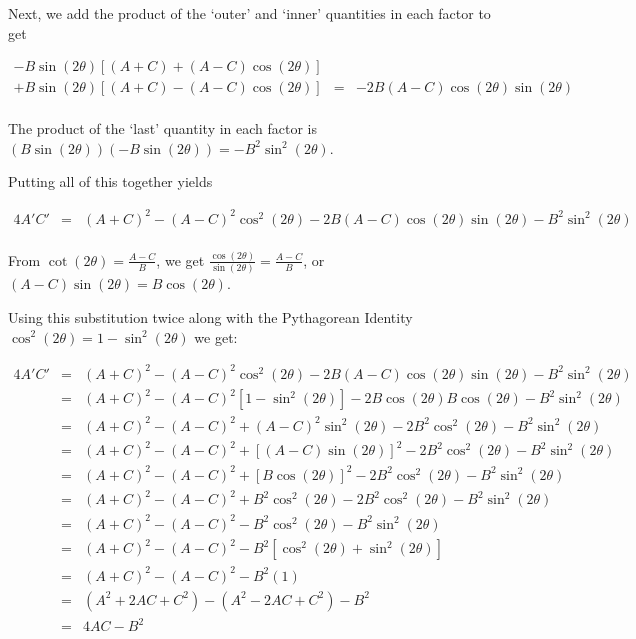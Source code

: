 \documentclass{ximera}
\begin{document}
Next, we add the product of the `outer' and `inner' quantities in each factor to get

\[ \begin{array}{rcl}

- B\sin(2\theta)\left[ (A+C) + (A-C)\cos(2\theta)\right] &&\\
+ B\sin(2\theta)\left[ (A+C)-(A-C)\cos(2\theta)\right] & = & -2B(A-C)\cos(2\theta)\sin(2\theta)  \\

\end{array} \]

The product of the `last' quantity in each factor is $(B\sin(2\theta))(- B\sin(2\theta)) = -B^2\sin^2(2\theta)$.  

 

Putting all of this together yields  


\[ \begin{array}{rcl}

4A'C' & = & (A+C)^2 - (A-C)^2 \cos^{2}(2\theta) -2B(A-C)\cos(2\theta)\sin(2\theta) -B^2\sin^2(2\theta) \\

\end{array} \]

From $\cot(2\theta) = \frac{A-C}{B}$, we get $\frac{\cos(2\theta)}{\sin(2\theta)} = \frac{A-C}{B}$, or $(A-C)\sin(2\theta)=B\cos(2\theta)$. 

 

Using this substitution twice along with the Pythagorean Identity $\cos^{2}(2\theta) = 1 - \sin^{2}(2\theta)$ we get:

\[ \begin{array}{rcl}

4A'C' & = & (A+C)^2 - (A-C)^2 \cos^{2}(2\theta) -2B(A-C)\cos(2\theta)\sin(2\theta) -B^2\sin^2(2\theta) \\  
      & = & (A+C)^2 - (A-C)^2 \left[ 1-\sin^{2}(2\theta)\right] -2B\cos(2\theta) B \cos(2\theta) -B^2\sin^2(2\theta) \\  
      & = & (A+C)^2 - (A-C)^2  + (A-C)^2 \sin^{2}(2\theta) -2B^2\cos^{2}(2\theta) -B^2\sin^2(2\theta) \\     
      & = & (A+C)^2 - (A-C)^2  +\left[(A-C) \sin(2\theta)\right]^2 -2B^2\cos^{2}(2\theta) -B^2\sin^2(2\theta)  \\      
      & = & (A+C)^2 - (A-C)^2  +\left[B \cos(2\theta)\right]^2 -2B^2\cos^{2}(2\theta) -B^2\sin^2(2\theta)  \\        
      & = & (A+C)^2 - (A-C)^2  +B^2\cos^{2}(2\theta) -2B^2\cos^{2}(2\theta) -B^2\sin^2(2\theta)  \\     
      & = & (A+C)^2 - (A-C)^2  -B^2\cos^{2}(2\theta) -B^2\sin^2(2\theta)  \\   
		  & = & (A+C)^2 - (A-C)^2  -B^2\left[\cos^{2}(2\theta)+ \sin^2(2\theta)\right]  \\    
		  & = & (A+C)^2 - (A-C)^2  -B^2 (1) \\   
	  	& = & \left(A^2 + 2AC+C^2\right) - \left(A^2 - 2AC+C^2\right)  -B^2  \\   			    			
	  	& = & 4AC  -B^2  \\   		
\end{array} \]
\end{document}

